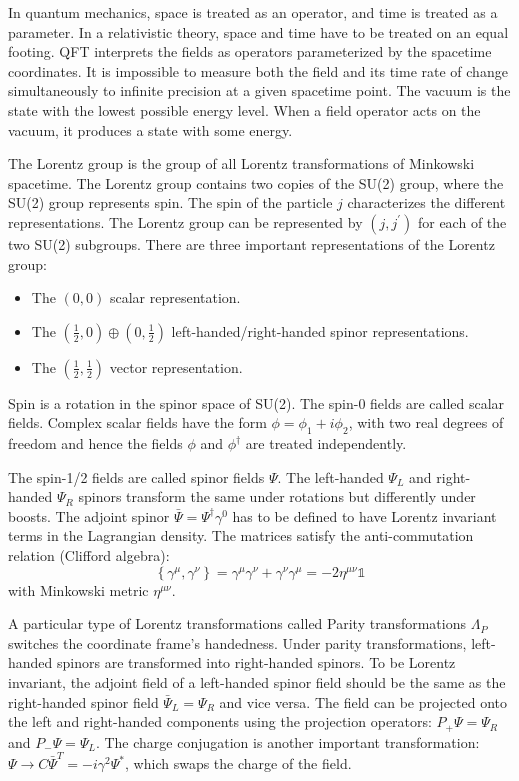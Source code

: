 In quantum mechanics, space is treated as an operator, and time is treated as a parameter. In a relativistic theory, space and time have to be treated on an equal footing. QFT interprets the fields as operators parameterized by the spacetime coordinates. It is impossible to measure both the field and its time rate of change simultaneously to infinite precision at a given spacetime point. The vacuum is the state with the lowest possible energy level. When a field operator acts on the vacuum, it produces a state with some energy.

The Lorentz group is the group of all Lorentz transformations of Minkowski spacetime. The Lorentz group contains two copies of the SU(2) group, where the SU(2) group represents spin. The spin of the particle $j$ characterizes the different representations. The Lorentz group can be represented by $(j, j^{\prime})$ for each of the two SU(2) subgroups. There are three important representations of the Lorentz group:

\begin{itemize}
\item The $(0, 0)$ scalar representation.
\item The $(\frac{1}{2}, 0) \oplus(0, \frac{1}{2} )$ left-handed/right-handed spinor representations.
\item The $(\frac{1}{2}, \frac{1}{2} )$ vector representation.
\end{itemize}

Spin is a rotation in the spinor space of SU(2). The spin-0 fields are called scalar fields. Complex scalar fields have the form $\phi = \phi_{1} + i \phi_{2}$, with two real degrees of freedom and hence the fields $\phi$ and $\phi^{\dagger}$ are treated independently.

The spin-1/2 fields are called spinor fields $\Psi$. The left-handed $\Psi_{L}$ and right-handed $\Psi_{R}$ spinors transform the same under rotations but differently under boosts. The adjoint spinor $\bar{\Psi}=\Psi^{\dagger} \gamma^{0}$ has to be defined to have Lorentz invariant terms in the Lagrangian density. The matrices satisfy the anti-commutation relation (Clifford algebra):
%
\[ \left\{\gamma^{\mu}, \gamma^{\nu}\right\}=\gamma^{\mu} \gamma^{\nu}+\gamma^{\nu} \gamma^{\mu}=-2 \eta^{\mu \nu} \mathbb{1} \]
%
with Minkowski metric $\eta^{\mu \nu}$.

A particular type of Lorentz transformations called Parity transformations $\Lambda_{P}$ switches the coordinate frame's handedness. Under parity transformations, left-handed spinors are transformed into right-handed spinors. To be Lorentz invariant, the adjoint field of a left-handed spinor field should be the same as the right-handed spinor field $\bar{\Psi}_{L}=\Psi_{R}$ and vice versa. The field can be projected onto the left and right-handed components using the projection operators: $P_{+} \Psi=\Psi_{R}$ and $P_{-} \Psi=\Psi_{L}$. The charge conjugation is another important transformation: $\Psi \to C \bar{\Psi}^{T}=-i \gamma^2 \Psi^{*}$, which swaps the charge of the field.

